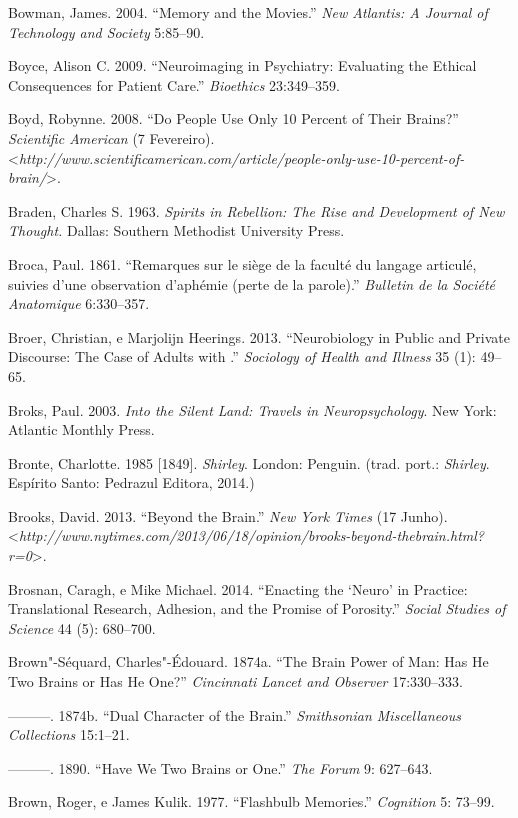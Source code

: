 Bowman, James. 2004. ``Memory and the Movies.'' \emph{New Atlantis: A
Journal of Technology and Society} 5:85--90.

Boyce, Alison C. 2009. ``Neuroimaging in Psychiatry: Evaluating the
Ethical Consequences for Patient Care.'' \emph{Bioethics} 23:349--359.

Boyd, Robynne. 2008. ``Do People Use Only 10 Percent of Their Brains?''
\emph{Scientific American} (7 Fevereiro).
\textless{}\emph{http://www.scientificamerican.com/article/people-only-use-10-percent-of-brain/}\textgreater{}.

Braden, Charles S. 1963. \emph{Spirits in Rebellion: The Rise and
Development of New Thought.} Dallas: Southern Methodist University
Press.

Broca, Paul. 1861. ``Remarques sur le siège de la faculté du langage
articulé, suivies d'une observation d'aphémie (perte de la parole).''
\emph{Bulletin de la Société Anatomique} 6:330--357.

Broer, Christian, e Marjolijn Heerings. 2013. ``Neurobiology in Public
and Private Discourse: The Case of Adults with .'' \emph{Sociology
of Health and Illness} 35 (1): 49--65.

Broks, Paul. 2003. \emph{Into the Silent Land: Travels in
Neuropsychology}. New York: Atlantic Monthly Press.

Bronte, Charlotte. 1985 {[}1849{]}. \emph{Shirley}. London: Penguin.
(trad. port.: \emph{Shirley}. Espírito Santo: Pedrazul Editora, 2014.)

Brooks, David. 2013. ``Beyond the Brain.'' \emph{New York Times} (17
Junho).
\textless{}\emph{http://www.nytimes.com/2013/06/18/opinion/brooks-beyond-thebrain.html?r=0}\textgreater{}.

Brosnan, Caragh, e Mike Michael. 2014. ``Enacting the `Neuro' in
Practice: Translational Research, Adhesion, and the Promise of
Porosity.'' \emph{Social Studies of Science} 44 (5): 680--700.

Brown"-Séquard, Charles"-Édouard. 1874a. ``The Brain Power of Man: Has He
Two Brains or Has He One?'' \emph{Cincinnati Lancet and Observer}
17:330--333.

---------. 1874b. ``Dual Character of the Brain.'' \emph{Smithsonian
Miscellaneous Collections} 15:1--21.

---------. 1890. ``Have We Two Brains or One.'' \emph{The Forum} 9:
627--643.

Brown, Roger, e James Kulik. 1977. ``Flashbulb Memories.''
\emph{Cognition} 5: 73--99.

